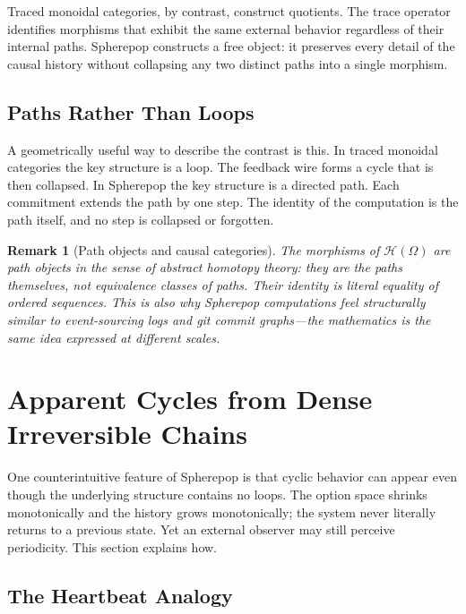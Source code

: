 \documentclass[12pt]{article}
\newtheorem{remark}{Remark}[section]
\begin{document}
Traced monoidal categories, by contrast, construct quotients. The trace operator identifies morphisms that exhibit the same external behavior regardless of their internal paths. Spherepop constructs a free object: it preserves every detail of the causal history without collapsing any two distinct paths into a single morphism.

\subsection{Paths Rather Than Loops}

A geometrically useful way to describe the contrast is this. In traced monoidal categories the key structure is a loop. The feedback wire forms a cycle that is then collapsed. In Spherepop the key structure is a directed path. Each commitment extends the path by one step. The identity of the computation is the path itself, and no step is collapsed or forgotten.

\begin{remark}[Path objects and causal categories]
The morphisms of $\mathcal{H}(\Omega)$ are path objects in the sense of abstract homotopy theory: they are the paths themselves, not equivalence classes of paths. Their identity is literal equality of ordered sequences. This is also why Spherepop computations feel structurally similar to event-sourcing logs and git commit graphs---the mathematics is the same idea expressed at different scales.
\end{remark}

\section{Apparent Cycles from Dense Irreversible Chains}
\label{sec:emergence}

One counterintuitive feature of Spherepop is that cyclic behavior can appear even though the underlying structure contains no loops. The option space shrinks monotonically and the history grows monotonically; the system never literally returns to a previous state. Yet an external observer may still perceive periodicity. This section explains how.

\subsection{The Heartbeat Analogy}
\end{document}
